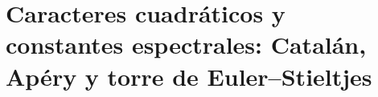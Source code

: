 \chapter{Caracteres cuadráticos y constantes espectrales: Catalán, Apéry y torre de Euler--Stieltjes}
\label{chap:p3-final:41:catalan_apery_euler}


